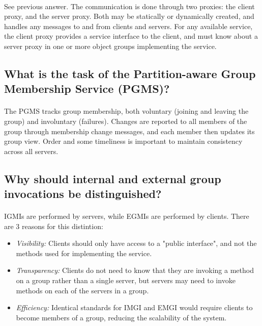 \documentclass[a4paper,11pt]{article}
\begin{document}
\paragraph{}
See previous answer. The communication is done through two proxies: the client proxy, and the server proxy. Both may be statically or dynamically created, and handles any messages to and from clients and servers. For any available service, the client proxy provides a service interface to the client, and must know about a server proxy in one or more object groups implementing the service. 

\subsection{
What is the task of the Partition-aware Group Membership Service (PGMS)?
}
\paragraph{}
The PGMS tracks group membership, both voluntary (joining and leaving the group) and involuntary (failures). Changes are reported to all members of the group through membership change messages, and each member then updates its group view. Order and some timeliness is important to maintain consistency across all servers.

\subsection{
Why should internal and external group invocations be distinguished?
}
\paragraph{}
IGMIs are performed by servers, while EGMIs are performed by clients. There are 3 reasons for this distintion:
\begin{itemize}
	\item \textit{Visibility:} Clients should only have access to a "public interface", and not the methods used for implementing the service. 
	\item \textit{Transparency:} Clients do not need to know that they are invoking a method on a group rather than a single server, but servers may need to invoke methods on each of the servers in a group.
	\item \textit{Efficiency:} Identical standards for IMGI and EMGI would require clients to become members of a group, reducing the scalability of the system.
\end{itemize}
\end{document}
